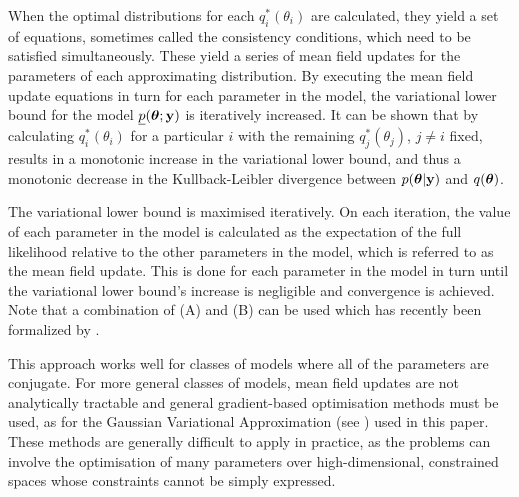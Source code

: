 When the optimal distributions for each $q_i^*(\theta_i)$ are calculated, they yield a set of equations,
sometimes called the consistency conditions, which need to be  satisfied simultaneously. These yield a series
of mean field updates for the parameters of each approximating distribution. By executing the mean field
update equations in turn for each parameter in the model, the variational lower bound for the model
$\underline{p}({\boldsymbol \theta}; {\bf y})$ is iteratively increased. It can be shown that by calculating $q_i^*(\theta_i)$
for  a particular $i$ with the remaining $q_j^*(\theta_j)$, $j\ne i$ fixed, results in a monotonic increase in
the variational lower bound, and thus a monotonic decrease in the Kullback-Leibler divergence between
$p({\boldsymbol \theta}|{\bf y})$ and $q({\boldsymbol \theta})$.

The variational lower bound is maximised iteratively. On each iteration, the value of each parameter in the
model is calculated as the expectation of the full likelihood relative to the other parameters in the model,
which is referred to as the mean field update. This is done for each parameter in the model in turn until the
variational lower bound's increase is negligible and convergence is achieved. Note that a combination of (A)
and (B) can be used which has recently been formalized by \cite{Rohde2015}.

This approach works well for classes of models where all of the parameters are conjugate. For more
general classes of models, mean field updates are not analytically tractable and general gradient-based
optimisation methods must be used, as for the Gaussian Variational Approximation (see \citep{Ormerod2012}) used
in this paper. These methods are generally difficult to apply in practice, as the problems can involve the
optimisation of many parameters over high-dimensional, constrained spaces whose constraints cannot be simply
expressed.






